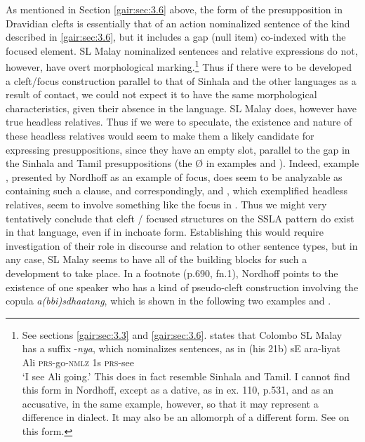  As mentioned in Section \ref{gair:sec:3.6} above, the form of the presupposition in Dravidian clefts is essentially that of an action nominalized sentence of the kind described in \ref{gair:sec:3.6},  
but it includes a gap (null item) co-indexed with the focused element. SL Malay nominalized sentences and relative expressions do not, however, have overt morphological marking.\footnote{See
  sections \ref{gair:sec:3.3} and \ref{gair:sec:3.6}. \citet[147]{Slomanson2006cll} states that Colombo SL Malay has a suffix -\textit{nya}, which nominalizes sentences, as in (his 21b) 
  \ea 
   sE ara-liyat\\ 
   Ali \textsc{prs}-go-\textsc{nmlz} 1s \textsc{prs}-see\\
  `I see Ali going.'
  \z
  This does in fact resemble Sinhala and Tamil. I cannot find this form in Nordhoff, except as a dative, as in ex. 110, p.531, and as an accusative, in the same example, however, so that it may represent a difference in dialect. It may also be an allomorph of a different form. See \citet[529]{Nordhoff2009} on this form.
} 
Thus if there were to be developed a cleft/focus construction parallel to that of Sinhala and the other languages as a result of contact, we could not expect it to have the same morphological characteristics, given their absence in the language. SL Malay does, however have true headless relatives. Thus if we were to speculate, the existence and nature of these headless relatives would seem to make them a likely candidate for expressing presuppositions, since they have an empty slot, parallel to the gap in the Sinhala and Tamil presuppositions (the {\O} in examples  and ). Indeed, example , presented by Nordhoff as an example of focus, does seem to be analyzable as containing such a clause, and correspondingly,  and , which exemplified headless relatives, seem to involve something like the focus in . Thus we might very tentatively conclude that  cleft / focused structures on the SSLA pattern do exist in that language, even if in inchoate form. Establishing this would require investigation of their role in discourse and relation to other sentence types, but in any case, SL Malay seems to have all of the building blocks for such a development to take place.
 In a footnote (p.690, fn.1), Nordhoff points to the existence of one speaker who has a kind of pseudo-cleft construction involving the copula \textit{a(bbi)sdhaatang}, which is shown in the following two examples  and .


